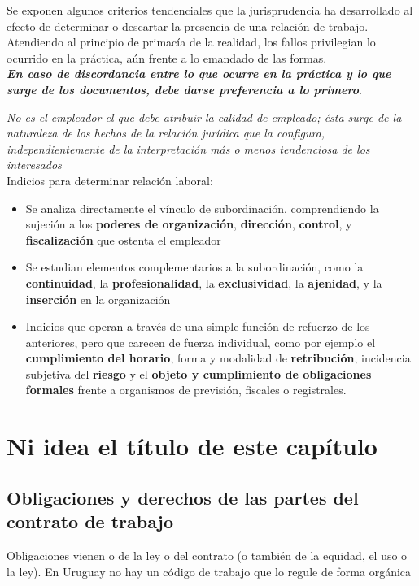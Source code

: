 \documentclass[spanish,12pt,a4paper,titlepage]{report}
\begin{document}
Se exponen algunos criterios tendenciales que la jurisprudencia ha desarrollado al efecto de determinar o descartar la presencia de una relación de trabajo.\\

Atendiendo al principio de primacía de la realidad, los fallos privilegian lo ocurrido en la práctica, aún frente a lo emandado de las formas.\\
\textbf{\textit{En caso de discordancia entre lo que ocurre en la práctica y lo que surge de los documentos, debe darse preferencia a lo primero}}.

\textit{No es el empleador el que debe atribuir la calidad de empleado; ésta surge de la naturaleza de los hechos de la relación jurídica que la configura, independientemente de la interpretación más o menos tendenciosa de los interesados}\\

Indicios para determinar relación laboral:
\begin{itemize}
	\item Se analiza directamente el vínculo de subordinación, comprendiendo la sujeción a los \textbf{poderes de organización}, \textbf{dirección}, \textbf{control}, y \textbf{fiscalización} que ostenta el empleador
	\item Se estudian elementos complementarios a la subordinación, como la \textbf{continuidad}, la \textbf{profesionalidad}, la \textbf{exclusividad}, la \textbf{ajenidad}, y la \textbf{inserción} en la organización
	\item Indicios que operan a través de una simple función de refuerzo de los anteriores, pero que carecen de fuerza individual, como por ejemplo el \textbf{cumplimiento del horario}, forma y modalidad de \textbf{retribución}, incidencia subjetiva del \textbf{riesgo} y el \textbf{objeto y cumplimiento de obligaciones formales} frente a organismos de previsión, fiscales o registrales.
\end{itemize}

\chapter{Ni idea el título de este capítulo}
\section{Obligaciones y derechos de las partes del contrato de trabajo}
Obligaciones vienen o de la ley o del contrato (o también de la equidad, el uso o la ley).
En Uruguay no hay un código de trabajo que lo regule de forma orgánica
\end{document}
